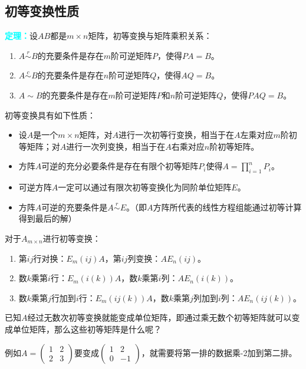 \documentclass[UTF8, 12pt]{ctexart}
\begin{document}
\subsection{初等变换性质}

\textcolor{aqua}{\textbf{定理：}}设$AB$都是$m\times n$矩阵，初等变换与矩阵乘积关系：\begin{enumerate}
\item $A\overset{r}{\sim}B$的充要条件是存在$m$阶可逆矩阵$P$，使得$PA=B$。
\item $A\overset{c}{\sim}B$的充要条件是存在$n$阶可逆矩阵$Q$，使得$AQ=B$。
\item $A\sim B$的充要条件是存在$m$阶可逆矩阵$P$和$n$阶可逆矩阵$Q$，使得$PAQ=B$。
\end{enumerate}

初等变换具有如下性质：

\begin{itemize}
\item 设$A$是一个$m\times n$矩阵，对$A$进行一次初等行变换，相当于在$A$左乘对应$m$阶初等矩阵；对$A$进行一次列变换，相当于在$A$右乘对应$n$阶初等矩阵。
\item 方阵$A$可逆的充分必要条件是存在有限个初等矩阵$P_i$使得$A=\prod\limits_{i=1}^nP_i$。
\item 可逆方阵$A$一定可以通过有限次初等变换化为同阶单位矩阵$E$。
\item 方阵$A$可逆的充要条件是$A\overset{r}{\sim}E$。（即$A$方阵所代表的线性方程组能通过初等计算得到最后的解）
\end{itemize}

对于$A_{m\times n}$进行初等变换：\begin{enumerate}
\item 第$ij$行对换：$E_m(ij)A$，第$ij$列变换：$AE_n(ij)$。
\item 数$k$乘第$i$行：$E_m(i(k))A$，数$k$乘第$i$列：$AE_n(i(k))$。
\item 数$k$乘第$j$行加到$i$行：$E_m(ij(k))A$，数$k$乘第$j$列加到$i$列：$AE_n(ij(k))$。
\end{enumerate}

已知$A$经过无数次初等变换就能变成单位矩阵，即通过乘无数个初等矩阵就可以变成单位矩阵，那么这些初等矩阵是什么呢？\medskip

例如$A=\left(\begin{array}{cc}
1 & 2 \\
2 & 3
\end{array}\right)$要变成$\left(\begin{array}{cc}
1 & 2 \\
0 & -1
\end{array}\right)$，就需要将第一排的数据乘-2加到第二排。
\end{document}
